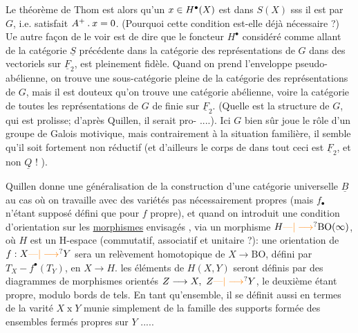 
Le théorème de Thom est alors qu'un $x\in H^{\bullet}(X)$ est dans $S(X)$ sss il est   par $G$, i.e. satisfait $A^{+}\mathbin{.}x=0$. (Pourquoi cette condition est-elle déjà nécessaire ?) Ue autre façon de le voir est de dire que le foncteur $H^{\bullet}$ considéré comme allant de la catégorie $\underline S$ précédente dans la catégorie des  représentations de $G$ dans des vectoriels sur $\underline F_2$, est pleinement fidèle.  Quand on prend l'enveloppe pseudo-abélienne, on trouve une sous-catégorie pleine de la catégorie des représentations de $G$, mais il est douteux qu'on trouve une catégorie abélienne, voire la catégorie de toutes les représentations de $G$ de  finie sur $\underline F_2$. (Quelle est la structure de $G$, qui est prolisse; d'après Quillen, il serait pro- ....). Ici $G$ bien sûr joue le rôle d'un groupe de Galois motivique, mais contrairement à la situation familière, il semble qu'il soit fortement non réductif (et d'ailleurs le corps de  dans tout ceci est $\underline F_2$, et non $\underline Q$ ! ).

Quillen donne une généralisation de la construction d'une catégorie universelle $\underline B$ au cas où on travaille avec des variétés pas nécessairement propres (mais $f_{\bullet}$ n'étant supposé défini que pour $f$ propre), et quand on introduit une condition d'orientation  sur les \uline{morphismes} envisagés , via un morphisme $H\unsure{\text{---}|\longrightarrow}\mathrm{BO}(\infty)$, où $H$ est un H-espace (commutatif, associatif et unitaire ?): une orientation de $f:X\unsure{\text{---}|\longrightarrow}Y$ sera un relèvement homotopique de $X\longrightarrow\mathrm{BO}$, défini par  $T_X-f^{\bullet}(T_Y)$, en $X\longrightarrow H$. les éléments de $H(X,Y)$ seront définis par des diagrammes de morphismes orientés $Z\longrightarrow X,\ Z\unsure{\text{---}|\longrightarrow}Y$, le deuxième étant propre, modulo bords de tels. En tant qu'ensemble, il se définit aussi en termes de la varité $X\mathbin{x}Y$ munie simplement de la famille des supports formée des ensembles fermés propres sur $Y$ .....

